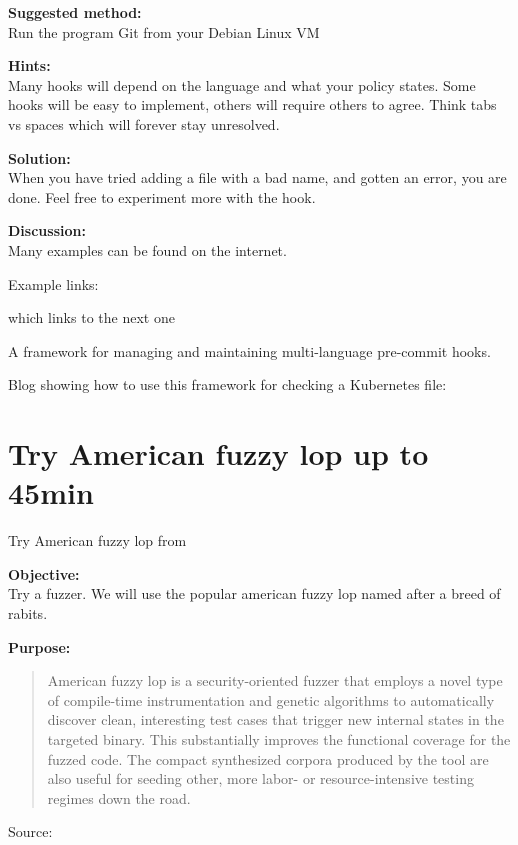 \documentclass[a4paper,11pt,notitlepage]{report}
\begin{document}
{\bf Suggested method:}\\
Run the program Git from your Debian Linux VM


{\bf Hints:}\\
Many hooks will depend on the language and what your policy states. Some hooks will be easy to implement, others will require others to agree. Think tabs vs spaces which will forever stay unresolved.

{\bf Solution:}\\
When you have tried adding a file with a bad name, and gotten an error, you are done. Feel free to experiment more with the hook.

{\bf Discussion:}\\
Many examples can be found on the internet.

Example links:
\begin{list2}
\item {} which links to the next one
\item A framework for managing and maintaining multi-language pre-commit hooks.\\
\item Blog showing how to use this framework for checking a Kubernetes file:\\
\end{list2}




\chapter{Try American fuzzy lop up to 45min}
\label{ex:american-fuzzy-lop}

Try American fuzzy lop from 

{\bf Objective:}\\
Try a fuzzer. We will use the popular american fuzzy lop named after a breed of rabits.


{\bf Purpose:}
\begin{quote}
American fuzzy lop is a security-oriented fuzzer that employs a novel type of compile-time instrumentation and genetic algorithms to automatically discover clean, interesting test cases that trigger new internal states in the targeted binary. This substantially improves the functional coverage for the fuzzed code. The compact synthesized corpora produced by the tool are also useful for seeding other, more labor- or resource-intensive testing regimes down the road.
\end{quote}
Source: 
\end{document}
